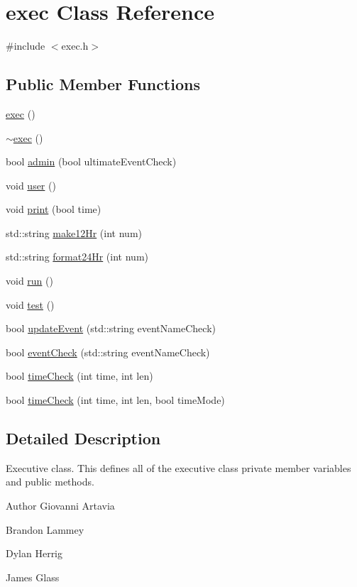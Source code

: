 \hypertarget{classexec}{}\section{exec Class Reference}
\label{classexec}


{\ttfamily \#include $<$exec.\+h$>$}

\subsection*{Public Member Functions}
\begin{DoxyCompactItemize}
\item 
\hyperlink{classexec_a2fac94db8f997a01a590c01478662339}{exec} ()
\item 
\hyperlink{classexec_a663a64f17c5431dc01a829f5633e4f56}{$\sim$exec} ()
\item 
bool \hyperlink{classexec_ab114315e1bb0daff8f96dc03e7c88392}{admin} (bool ultimate\+Event\+Check)
\item 
void \hyperlink{classexec_a924407f4d277807e949aa9e97470f536}{user} ()
\item 
void \hyperlink{classexec_a4cf771a565711689023aa75141f82c52}{print} (bool time)
\item 
std\+::string \hyperlink{classexec_ade14fc20cd40b2d5e3e8e5abbda382d4}{make12\+Hr} (int num)
\item 
std\+::string \hyperlink{classexec_a24a4ca6c8f63a73ed38ddc8e9d015c46}{format24\+Hr} (int num)
\item 
void \hyperlink{classexec_aad3ea9a2cd99fc28471062719b85b1f6}{run} ()
\item 
void \hyperlink{classexec_af6f7f6a6d2e09aa2d2616dddb58af53a}{test} ()
\item 
bool \hyperlink{classexec_a1d2075b76a47a05795d8ac9d6fb24cbe}{update\+Event} (std\+::string event\+Name\+Check)
\item 
bool \hyperlink{classexec_abf1c735a300deae3f5de4bf6891f2190}{event\+Check} (std\+::string event\+Name\+Check)
\item 
bool \hyperlink{classexec_a7e711b54128bd8ff8039886ce4ce6fb3}{time\+Check} (int time, int len)
\item 
bool \hyperlink{classexec_afc82b1343e127d9a7bdc36f050bdf605}{time\+Check} (int time, int len, bool time\+Mode)
\end{DoxyCompactItemize}


\subsection{Detailed Description}
Executive class. This defines all of the executive class\textquotesingle{} private member variables and public methods. \begin{DoxyAuthor}{Author}
Giovanni Artavia 

Brandon Lammey 

Dylan Herrig 

James Glass 
\end{DoxyAuthor}


